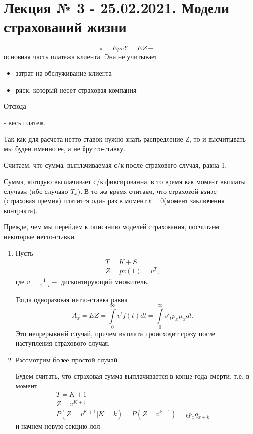 \chapter{Лекция № 3 - 25.02.2021. Модели страхований жизни} %
\begin{remem}
	\[ \pi = EpvY = EZ -\]
	основная часть платежа клиента.
Она не учитывает 
\begin{itemize}
	\item затрат на обслуживание клиента
	\item риск, который несет страховая компания 
\end{itemize}
\end{remem}

Отсюда
\begin{definition}
	 - весь платеж.
\end{definition}

Так как для расчета нетто-ставок нужно знать распредление Z, то и высчитывать мы будеи именно ее, а не брутто-ставку.

\begin{remark}
	Считаем, что сумма, выплачиваемая с/к после страхового случая, равна 1.
\end{remark}


Сумма, которую выплачивает с/к фиксированна, в то время как момент выплаты случаен (ибо случано $ T_x$). В то же время считаем, что страховой взнос (страховая премия) платится один раз в момент $ t = 0$(момент заключения контракта).

Прежде, чем мы перейдем к описанию моделей страхования, посчитаем некоторые нетто-ставки.

\begin{example}
	\begin{enumerate}
		\item {}

		Пусть 
		\begin{gather*}
			T = K + S\\
			Z = pv(1) = v^T, 
		\end{gather*}
		где $ v = \frac{1}{1+i} -  $ дисконтирующий множитель.

		Тогда одноразовая нетто-ставка равна
		\[ \overline{A}_x = EZ = \int\limits^{\infty}_{0}v^tf(t)dt = \int\limits^{\infty}_{0}v^t{}_tp_x\mu_xdt.\]
		Это непрерывный случай, причем выплата происходит сразу после наступления страхового случая.

		\item Рассмотрим более простой случай.

		Будем считать, что страховая сумма выплачивается в конце года смерти, т.е. в момент
		\begin{gather*}
			T = K+1\\
			Z = v^{K+1}\\
			P(Z = v^{K+1}| K = k) = P(Z = v^{k+1}) = {}_kp_xq_{x+k} 
		\end{gather*}
		и начнем новую секцию лол
	\end{enumerate}
\end{example}

